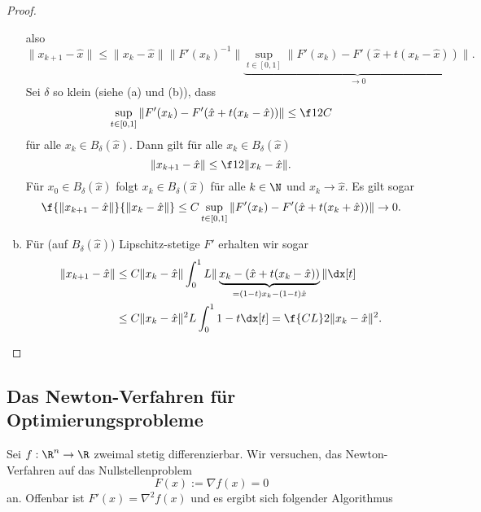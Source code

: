 \begin{st}
\begin{proof}
\begin{enumerate}[(a)]
				also
				\[
					\|x_{k+1} - \hat x\|
					\le \|x_k-\hat x\|\|F'(x_k)^{-1}\| \underbrace{\sup_{t\in [0,1]} \| F'(x_k) - F'(\hat x + t(x_k-\hat x)) \|}_{\to 0}.
				\]
				Sei $\delta$ so klein (siehe (a) und (b)), dass
				\[
					\sup_{t\in[0,1]} \|F'(x_k) - F'(\hat x + t(x_k - \hat x))\|
					\le \f 1{2C}
				\]
				für alle $x_k \in B_\delta(\hat x)$.
				Dann gilt für alle $x_k \in B_\delta(\hat x)$
				\[
					\|x_{k+1} - \hat x\| \le \f 12 \| x_k - \hat x\|.
				\]
				Für $x_0 \in B_\delta(\hat x)$ folgt $x_k \in B_\delta(\hat x)$ für alle $k \in \N$ und $x_k \to \hat x$.
				Es gilt sogar
				\[
					\f {\|x_{k+1} - \hat x\|}{\|x_k - \hat x\|} \le C \sup_{t\in [0,1]} \| F'(x_k) - F'(\hat x  + t(x_k + \hat x)) \| \to 0.
				\]
			\item
				Für (auf $B_\delta(\hat x)$) Lipschitz-stetige $F'$ erhalten wir sogar
				\begin{align*}
					\|x_{k+1} - \hat x\|
					&\le C \|x_k - \hat x\| \int_0^1 L \| \underbrace{x_k - (\hat x + t(x_k - \hat x))}_{=(1-t)x_k -(1-t)\hat x} \| \dx[t] \\
					&\le C \|x_k - \hat x\|^2 L \int_0^1 1-t \dx[t]
					= \f {CL}2 \|x_k - \hat x\|^2.
				\end{align*}
		\end{enumerate}
	\end{proof}
\end{st}

\subsection{Das Newton-Verfahren für Optimierungsprobleme}

Sei $f: \R^n \to \R$ zweimal stetig differenzierbar.
Wir versuchen, das Newton-Verfahren auf das Nullstellenproblem
\[
	F(x) := \nabla f(x) = 0
\]
an.
Offenbar ist $F'(x) = \nabla^2 f(x)$ und es ergibt sich folgender Algorithmus

\begin{alg} \label{alg:6}
	\begin{algorithmic}
		\EndWhile
	\end{algorithmic}
\end{alg}

